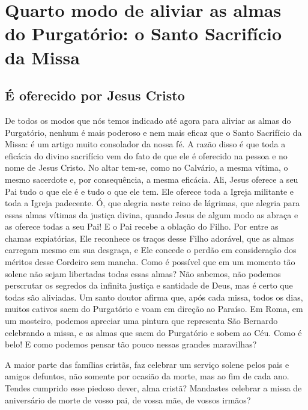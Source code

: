 \renewcommand{\thechapterdisplay}{Vigésimo terceiro dia}
\renewcommand{\thechapterrunner}{Quarto modo: o Santo Sacrifício da Missa}
\chapter[Vigésimo terceiro dia --- Quarto modo de aliviar as almas do Purgatório: o Santo Sacrifício da Missa]{Quarto modo de aliviar as almas do Purgatório: o Santo Sacrifício da Missa}
\section*{É oferecido por Jesus Cristo}

De todos os modos que nós temos indicado até agora para aliviar as almas do Purgatório, nenhum é mais poderoso e nem mais eficaz que o Santo Sacrifício da Missa: é um artigo muito consolador da nossa fé. A razão disso é que toda a eficácia do divino sacrifício vem do fato de que ele é oferecido na pessoa e no nome de Jesus Cristo. No altar tem-se, como no Calvário, a mesma vítima, o mesmo sacerdote e, por consequência, a mesma eficácia. Ali, Jesus oferece a seu Pai tudo o que ele é e tudo o que ele tem. Ele oferece toda a Igreja militante e toda a Igreja padecente. Ó, que alegria neste reino de lágrimas, que alegria para essas almas vítimas da justiça divina, quando Jesus de algum modo as abraça e as oferece todas a seu Pai! E o Pai recebe a oblação do Filho. Por entre as chamas expiatórias, Ele reconhece os traços desse Filho adorável, que as almas carregam mesmo em sua desgraça, e Ele concede o perdão em consideração dos méritos desse Cordeiro sem mancha. Como é possível que em um momento tão solene não sejam libertadas todas essas almas? Não sabemos, não podemos perscrutar os segredos da infinita justiça e santidade de Deus, mas é certo que todas são aliviadas. Um santo doutor afirma que, após cada missa, todos os dias, muitos cativos saem do Purgatório e voam em direção ao Paraíso. Em Roma, em um mosteiro, podemos apreciar uma pintura que representa São Bernardo celebrando a missa, e as almas que saem do Purgatório e sobem ao Céu. Como é belo! E como podemos pensar tão pouco nessas grandes maravilhas?

A maior parte das famílias cristãs, faz celebrar um serviço solene pelos pais e amigos defuntos, não somente por ocasião da morte, mas ao fim de cada ano. Tendes cumprido esse piedoso dever, alma cristã? Mandastes celebrar a missa de aniversário de morte de vosso pai, de vossa mãe, de vossos irmãos?


